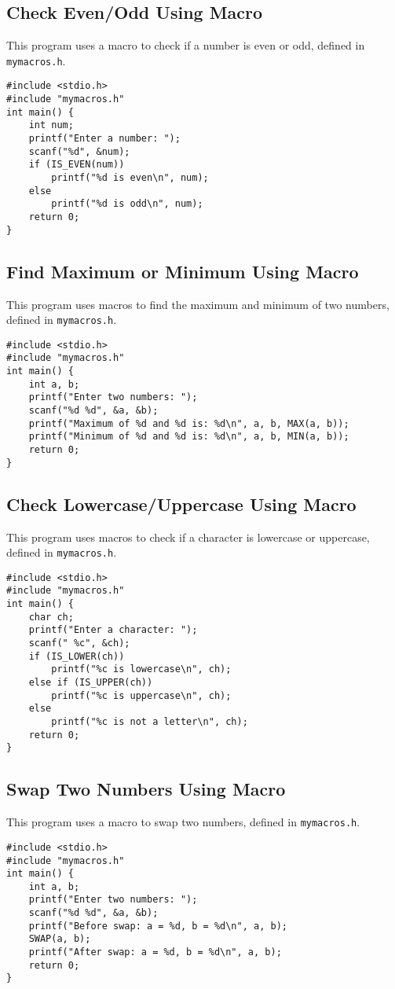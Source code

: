 \documentclass[a4paper,12pt]{article}
\begin{document}
\subsection{Check Even/Odd Using Macro}
This program uses a macro to check if a number is even or odd, defined in \texttt{mymacros.h}.
\begin{lstlisting}[caption={Check Even/Odd Using Macro}]
#include <stdio.h>
#include "mymacros.h"
int main() {
    int num;
    printf("Enter a number: ");
    scanf("%d", &num);
    if (IS_EVEN(num))
        printf("%d is even\n", num);
    else
        printf("%d is odd\n", num);
    return 0;
}
\end{lstlisting}
\clearpage

\subsection{Find Maximum or Minimum Using Macro}
This program uses macros to find the maximum and minimum of two numbers, defined in \texttt{mymacros.h}.
\begin{lstlisting}[caption={Find Maximum or Minimum Using Macro}]
#include <stdio.h>
#include "mymacros.h"
int main() {
    int a, b;
    printf("Enter two numbers: ");
    scanf("%d %d", &a, &b);
    printf("Maximum of %d and %d is: %d\n", a, b, MAX(a, b));
    printf("Minimum of %d and %d is: %d\n", a, b, MIN(a, b));
    return 0;
}
\end{lstlisting}
\clearpage

\subsection{Check Lowercase/Uppercase Using Macro}
This program uses macros to check if a character is lowercase or uppercase, defined in \texttt{mymacros.h}.
\begin{lstlisting}[caption={Check Lowercase/Uppercase Using Macro}]
#include <stdio.h>
#include "mymacros.h"
int main() {
    char ch;
    printf("Enter a character: ");
    scanf(" %c", &ch);
    if (IS_LOWER(ch))
        printf("%c is lowercase\n", ch);
    else if (IS_UPPER(ch))
        printf("%c is uppercase\n", ch);
    else
        printf("%c is not a letter\n", ch);
    return 0;
}
\end{lstlisting}
\clearpage

\subsection{Swap Two Numbers Using Macro}
This program uses a macro to swap two numbers, defined in \texttt{mymacros.h}.
\begin{lstlisting}[caption={Swap Two Numbers Using Macro}]
#include <stdio.h>
#include "mymacros.h"
int main() {
    int a, b;
    printf("Enter two numbers: ");
    scanf("%d %d", &a, &b);
    printf("Before swap: a = %d, b = %d\n", a, b);
    SWAP(a, b);
    printf("After swap: a = %d, b = %d\n", a, b);
    return 0;
}
\end{lstlisting}
\clearpage
\end{document}

